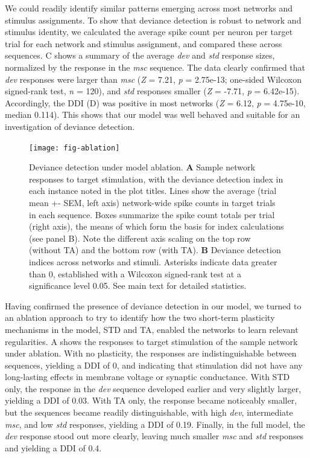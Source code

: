 \documentclass[9pt,lineno,onehalfspacing]{elife}
\newcommand{\dev}{\textit{dev}}
\newcommand{\msc}{\textit{msc}}
\newcommand{\std}{\textit{std}}
\begin{document}
We could readily identify similar patterns emerging across most networks and stimulus assignments. To show that deviance detection is robust to network and stimulus identity, we calculated the average spike count per neuron per target trial for each network and stimulus assignment, and compared these across sequences. C shows a summary of the average \dev{} and \std{} response sizes, normalized by the response in the \msc{} sequence. The data clearly confirmed that \dev{} responses were larger than \msc{} (\textit{Z} = 7.21, \textit{p} = 2.75e-13; one-sided Wilcoxon signed-rank test, \textit{n} = 120), and \std{} responses smaller (\textit{Z} = -7.71, \textit{p} = 6.42e-15). Accordingly, the DDI (D) was positive in most networks (\textit{Z} = 6.12, \textit{p} = 4.75e-10, median 0.114). This shows that our model was well behaved and suitable for an investigation of deviance detection.

\begin{figure}
    \texttt{[image: fig-ablation]}
    \caption{%
        Deviance detection under model ablation.
        \textbf{A} Sample network responses to target stimulation, with the deviance detection index in each instance noted in the plot titles. Lines show the average (trial mean +- SEM, left axis) network-wide spike counts in target trials in each sequence. Boxes summarize the spike count totals per trial (right axis), the means of which form the basis for index calculations (see panel B). Note the different axis scaling on the top row (without TA) and the bottom row (with TA).
        \textbf{B} Deviance detection indices across networks and stimuli. Asterisks indicate data greater than 0, established with a Wilcoxon signed-rank test at a significance level 0.05. See main text for detailed statistics.
    }
    \label{fig:ablation}
\end{figure}

Having confirmed the presence of deviance detection in our model, we turned to an ablation approach to try to identify how the two short-term plasticity mechanisms in the model, STD and TA, enabled the networks to learn relevant regularities. A shows the responses to target stimulation of the sample network under ablation. With no plasticity, the responses are indistinguishable between sequences, yielding a DDI of 0, and indicating that stimulation did not have any long-lasting effects in membrane voltage or synaptic conductance. With STD only, the response in the \dev{} sequence developed earlier and very slightly larger, yielding a DDI of 0.03. With TA only, the response became noticeably smaller, but the sequences became readily distinguishable, with high \dev{}, intermediate \msc{}, and low \std{} responses, yielding a DDI of 0.19. Finally, in the full model, the \dev{} response stood out more clearly, leaving much smaller \msc{} and \std{} responses and yielding a DDI of 0.4.
\end{document}
